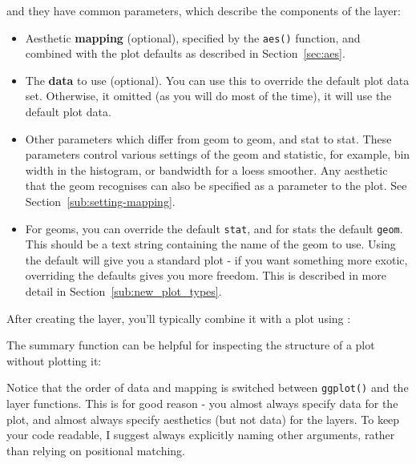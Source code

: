 \noindent and they have common parameters, which describe the components of the layer:

\begin{itemize}
	\item Aesthetic {\bf mapping} (optional), specified by the {\tt aes()} function, and combined with the plot defaults as described in Section~\ref{sec:aes}.

	\item The {\bf data} to use (optional).  You can use this to override the default plot data set.  Otherwise, it omitted  (as you will do most of the time), it will use the default plot data.
	
	\item Other parameters which differ from geom to geom, and stat to stat.  These parameters control various settings of the geom and statistic, for example, bin width in the histogram, or bandwidth for a loess smoother.  Any aesthetic that the geom recognises can also be specified as a parameter to the plot.  See Section~\ref{sub:setting-mapping}.
	
	\item For geoms, you can override the default {\tt stat}, and for stats the default {\tt geom}.  This should be a text string containing the name of the geom to use.  Using the default will give you a standard plot - if you want something more exotic, overriding the defaults gives you more freedom.  This is described in more detail in Section~\ref{sub:new_plot_types}.
  
\end{itemize}

After creating the layer, you'll typically combine it with a plot using  \code{+}:

% 


\noindent The summary function can be helpful for inspecting the structure of a plot without plotting it:

%

Notice that the order of data and mapping is switched between {\tt ggplot()} and the layer functions.  This is for good reason - you almost always specify data for the plot, and almost always specify aesthetics (but not data) for the layers.  To keep your code readable, I suggest always explicitly naming other arguments, rather than relying on positional matching.

